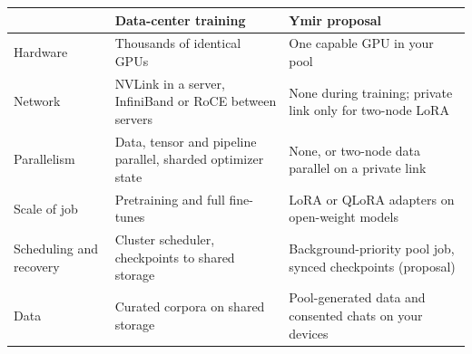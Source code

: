 {\small
\begin{xltabular}{\linewidth}{@{}L{2.9cm}YY@{}}
\toprule
 & Data-center training & Ymir proposal \\
\midrule
\endhead
Hardware & Thousands of identical GPUs & One capable GPU in your pool \\
Network & NVLink in a server, InfiniBand or RoCE between servers & None during training; private link only for two-node LoRA \\
Parallelism & Data, tensor and pipeline parallel, sharded optimizer state & None, or two-node data parallel on a private link \\
Scale of job & Pretraining and full fine-tunes & LoRA or QLoRA adapters on open-weight models \\
Scheduling and recovery & Cluster scheduler, checkpoints to shared storage & Background-priority pool job, synced checkpoints (proposal) \\
Data & Curated corpora on shared storage & Pool-generated data and consented chats on your devices \\
\bottomrule
\end{xltabular}
}
